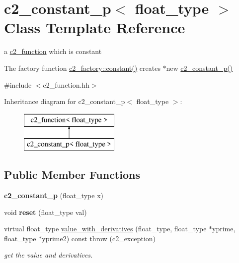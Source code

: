 \hypertarget{classc2__constant__p}{\section{c2\-\_\-constant\-\_\-p$<$ float\-\_\-type $>$ Class Template Reference}
\label{classc2__constant__p}
}


a \hyperlink{classc2__function}{c2\-\_\-function} which is constant

The factory function \hyperlink{classc2__factory_a98e385b2b927d15d4376821302061d4d}{c2\-\_\-factory\-::constant()} creates $\ast$new \hyperlink{classc2__constant__p}{c2\-\_\-constant\-\_\-p()}  




{\ttfamily \#include $<$c2\-\_\-function.\-hh$>$}

Inheritance diagram for c2\-\_\-constant\-\_\-p$<$ float\-\_\-type $>$\-:\begin{figure}[H]
\begin{center}
\leavevmode
\includegraphics[height=2.000000cm]{classc2__constant__p}
\end{center}
\end{figure}
\subsection*{Public Member Functions}
\begin{DoxyCompactItemize}
\item 
\hypertarget{classc2__constant__p_ae62311ccce870ca4fb79b7c9d525a3d2}{{\bfseries c2\-\_\-constant\-\_\-p} (float\-\_\-type x)}\label{classc2__constant__p_ae62311ccce870ca4fb79b7c9d525a3d2}

\item 
\hypertarget{classc2__constant__p_a5dd45be662a8358a43e25bab057e3aa9}{void {\bfseries reset} (float\-\_\-type val)}\label{classc2__constant__p_a5dd45be662a8358a43e25bab057e3aa9}

\item 
virtual float\-\_\-type \hyperlink{classc2__constant__p_a75ec878f6eb48c5ea0187197c645dd66}{value\-\_\-with\-\_\-derivatives} (float\-\_\-type, float\-\_\-type $\ast$yprime, float\-\_\-type $\ast$yprime2) const   throw (c2\-\_\-exception)
\begin{DoxyCompactList}\small\item\em get the value and derivatives. \end{DoxyCompactList}\end{DoxyCompactItemize}
